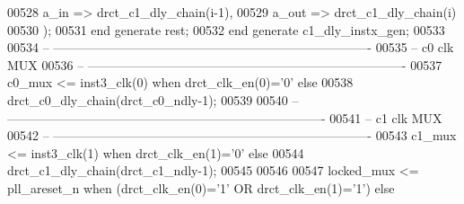 \begin{DoxyCode}
00528          a\_in  => drct_c1_dly_chain\textcolor{vhdlchar}{(}i-\textcolor{vhdllogic}{1}\textcolor{vhdlchar}{)},
00529          a\_out => drct_c1_dly_chain\textcolor{vhdlchar}{(}i\textcolor{vhdlchar}{)}
00530          \textcolor{vhdlchar}{)};
00531    \textcolor{keywordflow}{end} \textcolor{keywordflow}{generate} \textcolor{vhdlchar}{rest};
00532 \textcolor{keywordflow}{end} \textcolor{keywordflow}{generate} \textcolor{vhdlchar}{c1\_dly\_instx\_gen};
00533 
00534 \textcolor{keyword}{-- ----------------------------------------------------------------------------}
00535 \textcolor{keyword}{-- c0 clk MUX}
00536 \textcolor{keyword}{-- ----------------------------------------------------------------------------}
00537 \textcolor{vhdlchar}{c0_mux} \textcolor{vhdlchar}{<=}   \textcolor{vhdlchar}{inst3_clk}\textcolor{vhdlchar}{(}\textcolor{vhdllogic}{}\textcolor{vhdllogic}{0}\textcolor{vhdlchar}{)} \textcolor{keywordflow}{when} \textcolor{vhdlchar}{drct_clk_en}\textcolor{vhdlchar}{(}\textcolor{vhdllogic}{}\textcolor{vhdllogic}{0}\textcolor{vhdlchar}{)}\textcolor{vhdlchar}{=}\textcolor{vhdlchar}{'}\textcolor{vhdllogic}{}\textcolor{vhdllogic}{0}\textcolor{vhdlchar}{'} \textcolor{keywordflow}{else} 
00538             \textcolor{vhdlchar}{drct_c0_dly_chain}\textcolor{vhdlchar}{(}\textcolor{vhdlchar}{drct_c0_ndly}\textcolor{vhdlchar}{-}\textcolor{vhdllogic}{}\textcolor{vhdllogic}{1}\textcolor{vhdlchar}{)};
00539 
00540 \textcolor{keyword}{-- ----------------------------------------------------------------------------}
00541 \textcolor{keyword}{-- c1 clk MUX}
00542 \textcolor{keyword}{-- ----------------------------------------------------------------------------}
00543 \textcolor{vhdlchar}{c1_mux} \textcolor{vhdlchar}{<=}   \textcolor{vhdlchar}{inst3_clk}\textcolor{vhdlchar}{(}\textcolor{vhdllogic}{}\textcolor{vhdllogic}{1}\textcolor{vhdlchar}{)} \textcolor{keywordflow}{when} \textcolor{vhdlchar}{drct_clk_en}\textcolor{vhdlchar}{(}\textcolor{vhdllogic}{}\textcolor{vhdllogic}{1}\textcolor{vhdlchar}{)}\textcolor{vhdlchar}{=}\textcolor{vhdlchar}{'}\textcolor{vhdllogic}{}\textcolor{vhdllogic}{0}\textcolor{vhdlchar}{'} \textcolor{keywordflow}{else} 
00544             \textcolor{vhdlchar}{drct_c1_dly_chain}\textcolor{vhdlchar}{(}\textcolor{vhdlchar}{drct_c1_ndly}\textcolor{vhdlchar}{-}\textcolor{vhdllogic}{}\textcolor{vhdllogic}{1}\textcolor{vhdlchar}{)};
00545 
00546 
00547 locked\_mux <=  pll\_areset\_n \textcolor{keywordflow}{when} (drct\_clk\_en(\textcolor{vhdllogic}{0})='1' \textcolor{keywordflow}{OR} drct\_clk\_en(\textcolor{vhdllogic}{1})='1') \textcolor{keywordflow}{else}

\end{DoxyCode}
